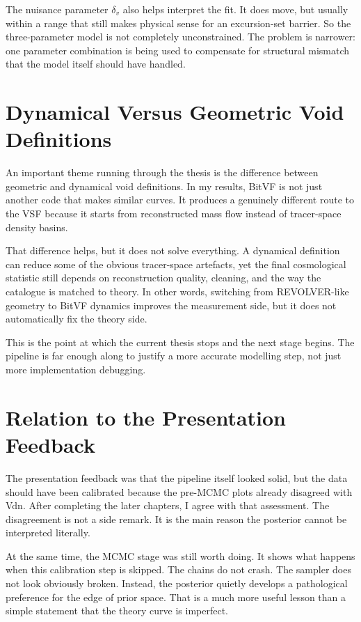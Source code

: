 \documentclass[12pt]{report}
\begin{document}
The nuisance parameter $\delta_v$ also helps interpret the fit. It does move, but usually within a range that still makes physical sense for an excursion-set barrier. So the three-parameter model is not completely unconstrained. The problem is narrower: one parameter combination is being used to compensate for structural mismatch that the model itself should have handled.

\section{Dynamical Versus Geometric Void Definitions}

An important theme running through the thesis is the difference between geometric and dynamical void definitions. In my results, BitVF is not just another code that makes similar curves. It produces a genuinely different route to the VSF because it starts from reconstructed mass flow instead of tracer-space density basins.

That difference helps, but it does not solve everything. A dynamical definition can reduce some of the obvious tracer-space artefacts, yet the final cosmological statistic still depends on reconstruction quality, cleaning, and the way the catalogue is matched to theory. In other words, switching from REVOLVER-like geometry to BitVF dynamics improves the measurement side, but it does not automatically fix the theory side.

This is the point at which the current thesis stops and the next stage begins. The pipeline is far enough along to justify a more accurate modelling step, not just more implementation debugging.

\section{Relation to the Presentation Feedback}

The presentation feedback was that the pipeline itself looked solid, but the data should have been calibrated because the pre-MCMC plots already disagreed with Vdn. After completing the later chapters, I agree with that assessment. The disagreement is not a side remark. It is the main reason the posterior cannot be interpreted literally.

At the same time, the MCMC stage was still worth doing. It shows what happens when this calibration step is skipped. The chains do not crash. The sampler does not look obviously broken. Instead, the posterior quietly develops a pathological preference for the edge of prior space. That is a much more useful lesson than a simple statement that the theory curve is imperfect.
\end{document}
